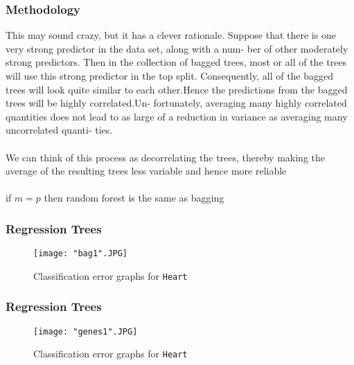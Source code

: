 \documentclass{beamer}
\begin{document}
\begin{frame}
\frametitle{Methodology}


This may sound crazy, but it has a clever rationale. Suppose
that there is one very strong predictor in the data set, along with a num-
ber of other moderately strong predictors. Then in the collection of bagged
trees, most or all of the trees will use this strong predictor in the top split.
Consequently, all of the bagged trees will look quite similar to each other.Hence the predictions from the bagged trees will be highly correlated.Un-
fortunately, averaging many highly correlated quantities does not lead to
as large of a reduction in variance as averaging many uncorrelated quanti-
ties.
\\~\\
We can think of this process as decorrelating
the trees, thereby making the average of the resulting trees less variable
and hence more reliable
\\~\\
if $m=p$ then random forest is the same as bagging



\end{frame} 


\begin{frame}
\frametitle{Regression Trees}
\begin{figure}[H]
\caption{Classification error graphs for \texttt{Heart}}
\texttt{[image: "bag1".JPG]} 
\end{figure}
\end{frame} 



\begin{frame}
\frametitle{Regression Trees}
\begin{figure}[H]
\caption{Classification error graphs for \texttt{Heart}}
\texttt{[image: "genes1".JPG]} 
\end{figure}
\end{frame} 
\end{document}
